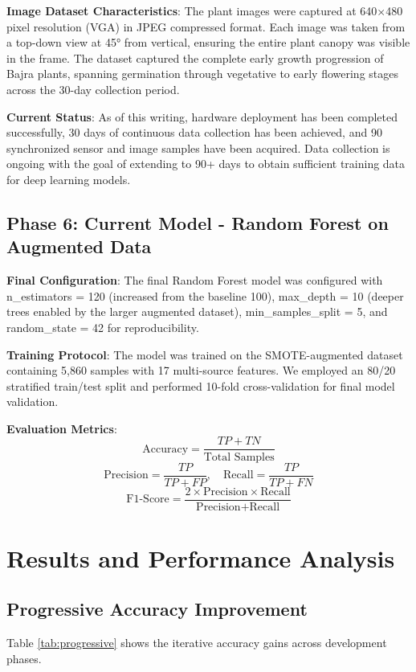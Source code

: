 \documentclass[10pt,twocolumn]{article}
\begin{document}
\textbf{Image Dataset Characteristics}: The plant images were captured at 640×480 pixel resolution (VGA) in JPEG compressed format. Each image was taken from a top-down view at 45° from vertical, ensuring the entire plant canopy was visible in the frame. The dataset captured the complete early growth progression of Bajra plants, spanning germination through vegetative to early flowering stages across the 30-day collection period.

\textbf{Current Status}: As of this writing, hardware deployment has been completed successfully, 30 days of continuous data collection has been achieved, and 90 synchronized sensor and image samples have been acquired. Data collection is ongoing with the goal of extending to 90+ days to obtain sufficient training data for deep learning models.

\subsection{Phase 6: Current Model - Random Forest on Augmented Data}

\textbf{Final Configuration}: The final Random Forest model was configured with n\_estimators = 120 (increased from the baseline 100), max\_depth = 10 (deeper trees enabled by the larger augmented dataset), min\_samples\_split = 5, and random\_state = 42 for reproducibility.

\textbf{Training Protocol}: The model was trained on the SMOTE-augmented dataset containing 5,860 samples with 17 multi-source features. We employed an 80/20 stratified train/test split and performed 10-fold cross-validation for final model validation.

\textbf{Evaluation Metrics}:
\[
\text{Accuracy} = \frac{TP + TN}{\text{Total Samples}}
\]
\[
\text{Precision} = \frac{TP}{TP + FP}, \quad \text{Recall} = \frac{TP}{TP + FN}
\]
\[
\text{F1-Score} = \frac{2 \times \text{Precision} \times \text{Recall}}{\text{Precision} + \text{Recall}}
\]

\section{Results and Performance Analysis}

\subsection{Progressive Accuracy Improvement}

Table \ref{tab:progressive} shows the iterative accuracy gains across development phases.
\end{document}
